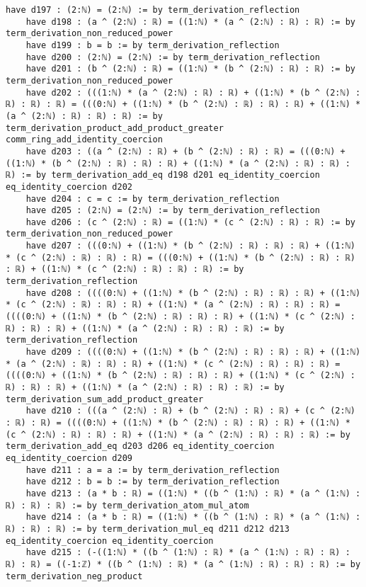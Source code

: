 \documentclass{article}
\begin{document}
\begin{tcolorbox}[colback=white!10, width=\linewidth]
\begin{lstlisting}[language=Lean4]
    have d197 : (2:ℕ) = (2:ℕ) := by term_derivation_reflection
    have d198 : (a ^ (2:ℕ) : ℝ) = ((1:ℕ) * (a ^ (2:ℕ) : ℝ) : ℝ) := by term_derivation_non_reduced_power
    have d199 : b = b := by term_derivation_reflection
    have d200 : (2:ℕ) = (2:ℕ) := by term_derivation_reflection
    have d201 : (b ^ (2:ℕ) : ℝ) = ((1:ℕ) * (b ^ (2:ℕ) : ℝ) : ℝ) := by term_derivation_non_reduced_power
    have d202 : (((1:ℕ) * (a ^ (2:ℕ) : ℝ) : ℝ) + ((1:ℕ) * (b ^ (2:ℕ) : ℝ) : ℝ) : ℝ) = (((0:ℕ) + ((1:ℕ) * (b ^ (2:ℕ) : ℝ) : ℝ) : ℝ) + ((1:ℕ) * (a ^ (2:ℕ) : ℝ) : ℝ) : ℝ) := by term_derivation_product_add_product_greater comm_ring_add_identity_coercion
    have d203 : ((a ^ (2:ℕ) : ℝ) + (b ^ (2:ℕ) : ℝ) : ℝ) = (((0:ℕ) + ((1:ℕ) * (b ^ (2:ℕ) : ℝ) : ℝ) : ℝ) + ((1:ℕ) * (a ^ (2:ℕ) : ℝ) : ℝ) : ℝ) := by term_derivation_add_eq d198 d201 eq_identity_coercion eq_identity_coercion d202
    have d204 : c = c := by term_derivation_reflection
    have d205 : (2:ℕ) = (2:ℕ) := by term_derivation_reflection
    have d206 : (c ^ (2:ℕ) : ℝ) = ((1:ℕ) * (c ^ (2:ℕ) : ℝ) : ℝ) := by term_derivation_non_reduced_power
    have d207 : (((0:ℕ) + ((1:ℕ) * (b ^ (2:ℕ) : ℝ) : ℝ) : ℝ) + ((1:ℕ) * (c ^ (2:ℕ) : ℝ) : ℝ) : ℝ) = (((0:ℕ) + ((1:ℕ) * (b ^ (2:ℕ) : ℝ) : ℝ) : ℝ) + ((1:ℕ) * (c ^ (2:ℕ) : ℝ) : ℝ) : ℝ) := by term_derivation_reflection
    have d208 : ((((0:ℕ) + ((1:ℕ) * (b ^ (2:ℕ) : ℝ) : ℝ) : ℝ) + ((1:ℕ) * (c ^ (2:ℕ) : ℝ) : ℝ) : ℝ) + ((1:ℕ) * (a ^ (2:ℕ) : ℝ) : ℝ) : ℝ) = ((((0:ℕ) + ((1:ℕ) * (b ^ (2:ℕ) : ℝ) : ℝ) : ℝ) + ((1:ℕ) * (c ^ (2:ℕ) : ℝ) : ℝ) : ℝ) + ((1:ℕ) * (a ^ (2:ℕ) : ℝ) : ℝ) : ℝ) := by term_derivation_reflection
    have d209 : ((((0:ℕ) + ((1:ℕ) * (b ^ (2:ℕ) : ℝ) : ℝ) : ℝ) + ((1:ℕ) * (a ^ (2:ℕ) : ℝ) : ℝ) : ℝ) + ((1:ℕ) * (c ^ (2:ℕ) : ℝ) : ℝ) : ℝ) = ((((0:ℕ) + ((1:ℕ) * (b ^ (2:ℕ) : ℝ) : ℝ) : ℝ) + ((1:ℕ) * (c ^ (2:ℕ) : ℝ) : ℝ) : ℝ) + ((1:ℕ) * (a ^ (2:ℕ) : ℝ) : ℝ) : ℝ) := by term_derivation_sum_add_product_greater
    have d210 : (((a ^ (2:ℕ) : ℝ) + (b ^ (2:ℕ) : ℝ) : ℝ) + (c ^ (2:ℕ) : ℝ) : ℝ) = ((((0:ℕ) + ((1:ℕ) * (b ^ (2:ℕ) : ℝ) : ℝ) : ℝ) + ((1:ℕ) * (c ^ (2:ℕ) : ℝ) : ℝ) : ℝ) + ((1:ℕ) * (a ^ (2:ℕ) : ℝ) : ℝ) : ℝ) := by term_derivation_add_eq d203 d206 eq_identity_coercion eq_identity_coercion d209
    have d211 : a = a := by term_derivation_reflection
    have d212 : b = b := by term_derivation_reflection
    have d213 : (a * b : ℝ) = ((1:ℕ) * ((b ^ (1:ℕ) : ℝ) * (a ^ (1:ℕ) : ℝ) : ℝ) : ℝ) := by term_derivation_atom_mul_atom
    have d214 : (a * b : ℝ) = ((1:ℕ) * ((b ^ (1:ℕ) : ℝ) * (a ^ (1:ℕ) : ℝ) : ℝ) : ℝ) := by term_derivation_mul_eq d211 d212 d213 eq_identity_coercion eq_identity_coercion
    have d215 : (-((1:ℕ) * ((b ^ (1:ℕ) : ℝ) * (a ^ (1:ℕ) : ℝ) : ℝ) : ℝ) : ℝ) = ((-1:ℤ) * ((b ^ (1:ℕ) : ℝ) * (a ^ (1:ℕ) : ℝ) : ℝ) : ℝ) := by term_derivation_neg_product

\end{lstlisting}
\end{tcolorbox}
\end{document}
